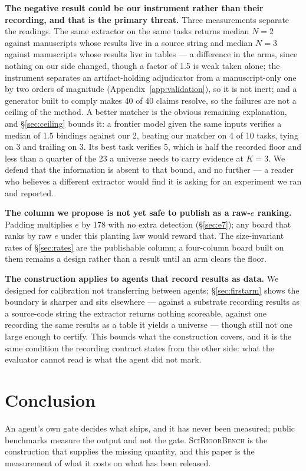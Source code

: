 \documentclass[10pt]{article}
\newcommand{\RM}[1]{{#1}}
\begin{document}
\textbf{The negative result could be our instrument rather than their
recording, and that is the primary threat.} Three measurements separate the
readings. The same extractor on the same tasks returns median $N=\RM{2}$ against
manuscripts whose results live in a source string and median $N=\RM{3}$ against
manuscripts whose results live in tables --- a difference in the arms, since
nothing on our side changed, though a factor of \RM{1.5} is weak taken alone; the instrument separates an artifact-holding adjudicator
from a manuscript-only one by two orders of magnitude
(Appendix~\ref{app:validation}), so it is not inert; and a generator built to
comply makes \RM{40} of \RM{40} claims resolve, so the failures are not a
ceiling of the method. A better matcher is the obvious remaining explanation, and
\S\ref{sec:ceiling} bounds it: a frontier model given the same inputs verifies
a median of \RM{1.5} bindings against our \RM{2}, beating our matcher on
\RM{4} of \RM{10} tasks, tying on \RM{3} and trailing on \RM{3}. Its best task
verifies \RM{5}, which is half the recorded floor and less than a quarter of
the \RM{23} a universe needs to carry evidence at $K=\RM{3}$. We defend that the information is absent to that
bound, and no further --- a reader who believes a different extractor would
find it is asking for an experiment we ran and reported.

\textbf{The column we propose is not yet safe to publish as a raw-$e$ ranking.}
Padding multiplies $e$ by \RM{178} with no extra detection (\S\ref{sec:e7}); any
board that ranks by raw $e$ under this planting law would reward that. The
size-invariant rates of \S\ref{sec:rates} are the publishable column; a
four-column board built on them remains a design rather than a result until an
arm clears the floor.

\textbf{The construction applies to agents that record results as data.} We
designed for calibration not transferring between agents; \S\ref{sec:firstarm}
shows the boundary is sharper and sits elsewhere --- against a substrate
recording results as a source-code string the extractor returns nothing
scoreable, against one recording the same results as a table it yields a
universe --- though still not one large enough to certify. This bounds what the
construction covers, and it is
the same condition the recording contract states from the other side: what the
evaluator cannot read is what the agent did not mark.

\section{Conclusion}
An agent's own gate decides what ships, and it has never been measured; public
benchmarks measure the output and not the gate. \textsc{SciRigorBench} is the
construction that supplies the missing quantity, and this paper is the
measurement of what it costs on what has been released.
\end{document}
